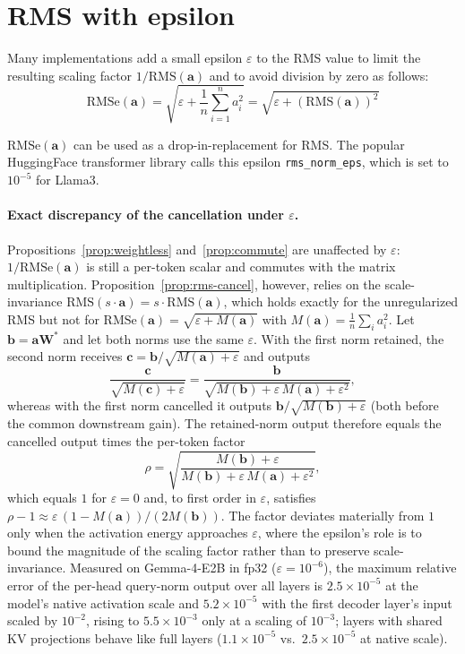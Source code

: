 \documentclass{article}
\def\rms{\text{RMS}(\mathbf{a})}      %
\def\f1n{\frac{1}{n}}                 %
\def\sas{\sum_{i=1}^n a_i^2}           %
\def\a{\mathbf{a}}                    %
\begin{document}
\section{RMS with epsilon}\label{app:epsilon}
Many implementations add a small epsilon $\varepsilon$ to the RMS value to limit the resulting scaling factor $1/\mathrm{RMS}(\mathbf{a})$ and to avoid division by zero as follows:
\begin{equation*}
 \text{RMSe}(\a) = \sqrt{\varepsilon + \f1n \sas} = \sqrt{\varepsilon + \left( \rms \right)^2}
\end{equation*}

$\text{RMSe}(\a)$ can be used as a drop-in-replacement for RMS. The popular HuggingFace transformer library calls this epsilon \verb+rms_norm_eps+, which is set to $10^{-5}$ for Llama3.

\paragraph{Exact discrepancy of the cancellation under $\varepsilon$.}
Propositions~\ref{prop:weightless} and~\ref{prop:commute} are unaffected by $\varepsilon$: $1/\mathrm{RMSe}(\mathbf{a})$ is still a per-token scalar and commutes with the matrix multiplication. Proposition~\ref{prop:rms-cancel}, however, relies on the scale-invariance $\mathrm{RMS}(s\cdot\mathbf{a}) = s\cdot\mathrm{RMS}(\mathbf{a})$, which holds exactly for the unregularized RMS but not for $\mathrm{RMSe}(\mathbf{a}) = \sqrt{\varepsilon + M(\mathbf{a})}$ with $M(\mathbf{a}) = \tfrac{1}{n}\sum_i a_i^2$. Let $\mathbf{b} = \mathbf{a}\mathbf{W}^*$ and let both norms use the same $\varepsilon$. With the first norm retained, the second norm receives $\mathbf{c} = \mathbf{b}/\sqrt{M(\mathbf{a})+\varepsilon}$ and outputs
\begin{equation*}
  \frac{\mathbf{c}}{\sqrt{M(\mathbf{c})+\varepsilon}}
  = \frac{\mathbf{b}}{\sqrt{M(\mathbf{b}) + \varepsilon\,M(\mathbf{a}) + \varepsilon^2}},
\end{equation*}
whereas with the first norm cancelled it outputs $\mathbf{b}/\sqrt{M(\mathbf{b})+\varepsilon}$ (both before the common downstream gain). The retained-norm output therefore equals the cancelled output times the per-token factor
\begin{equation*}
  \rho = \sqrt{\frac{M(\mathbf{b})+\varepsilon}{M(\mathbf{b}) + \varepsilon\,M(\mathbf{a}) + \varepsilon^2}},
\end{equation*}
which equals $1$ for $\varepsilon = 0$ and, to first order in $\varepsilon$, satisfies $\rho - 1 \approx \varepsilon\,(1 - M(\mathbf{a}))/(2M(\mathbf{b}))$. The factor deviates materially from $1$ only when the activation energy approaches $\varepsilon$, where the epsilon's role is to bound the magnitude of the scaling factor rather than to preserve scale-invariance. Measured on Gemma-4-E2B in fp32 ($\varepsilon = 10^{-6}$), the maximum relative error of the per-head query-norm output over all layers is $2.5\times10^{-5}$ at the model's native activation scale and $5.2\times10^{-5}$ with the first decoder layer's input scaled by $10^{-2}$, rising to $5.5\times10^{-3}$ only at a scaling of $10^{-3}$; layers with shared KV projections behave like full layers ($1.1\times10^{-5}$ vs.\ $2.5\times10^{-5}$ at native scale).
\end{document}
